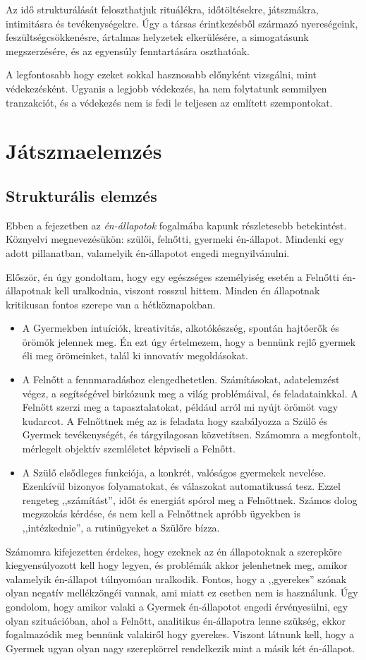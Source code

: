 \documentclass[a4paper,12pt]{article}
\begin{document}
	Az idő strukturálását  feloszthatjuk rituálékra, időtöltésekre, játszmákra, intimitásra és tevékenységekre. Úgy a társas érintkezésből származó nyereségeink, feszültségcsökkenésre, ártalmas helyzetek elkerülésére, a simogatásunk megszerzésére, és az egyensúly fenntartására oszthatóak.
	
	A legfontosabb hogy ezeket sokkal hasznosabb előnyként vizsgálni, mint védekezésként. Ugyanis a legjobb védekezés, ha nem folytatunk semmilyen tranzakciót, és a védekezés nem is fedi le teljesen az említett szempontokat.

	\section{Játszmaelemzés}
	\subsection{Strukturális elemzés}
	
	Ebben a fejezetben az \textit{én-állapotok} fogalmába kapunk részletesebb betekintést. Köznyelvi megnevezésükön: szülői, felnőtti, gyermeki én-állapot. Mindenki egy adott pillanatban, valamelyik én-állapotot engedi megnyilvánulni.
	
	Először, én úgy gondoltam, hogy egy egészséges személyiség esetén a Felnőtti én-állapotnak kell uralkodnia, viszont rosszul hittem. Minden én állapotnak kritikusan fontos szerepe van a hétköznapokban.
	\begin{itemize}
		\item A Gyermekben intuíciók, kreativitás, alkotókészség, spontán hajtóerők és örömök jelennek meg. Én ezt úgy értelmezem, hogy a bennünk rejlő gyermek éli meg örömeinket, talál ki innovatív megoldásokat.
		\item A Felnőtt a fennmaradáshoz elengedhetetlen. Számításokat, adatelemzést végez, a segítségével birkózunk meg a világ problémáival, és feladatainkkal. A Felnőtt szerzi meg a tapasztalatokat, például arról mi nyújt örömöt vagy kudarcot. A Felnőttnek még az is feladata hogy szabályozza a Szülő és Gyermek tevékenységét, és tárgyilagosan közvetítsen. Számomra a megfontolt, mérlegelt objektív szemléletet képviseli a Felnőtt.
		\item A Szülő elsődleges funkciója, a konkrét, valóságos gyermekek nevelése. Ezenkívül bizonyos folyamatokat, és válaszokat automatikussá tesz. Ezzel rengeteg ,,számítást'', időt és energiát spórol meg a Felnőttnek. Számos dolog megszokás kérdése, és nem kell a Felnőttnek apróbb ügyekben is ,,intézkednie'', a rutinügyeket a Szülőre bízza.
	\end{itemize}
	Számomra kifejezetten érdekes, hogy ezeknek az én állapotoknak a szerepköre kiegyensúlyozott kell hogy legyen, és problémák akkor jelenhetnek meg, amikor valamelyik én-állapot túlnyomóan uralkodik. Fontos, hogy a ,,gyerekes'' szónak olyan negatív mellékzöngéi vannak, ami miatt ez esetben nem is használunk. Úgy gondolom, hogy amikor valaki a Gyermek én-állapotot engedi érvényesülni, egy olyan szituációban, ahol a Felnőtt, analitikus én-állapotra lenne szükség, ekkor fogalmazódik meg bennünk valakiről hogy gyerekes. Viszont látnunk kell, hogy a Gyermek ugyan olyan nagy szerepkörrel rendelkezik mint a másik két én-állapot.
	
\end{document}
